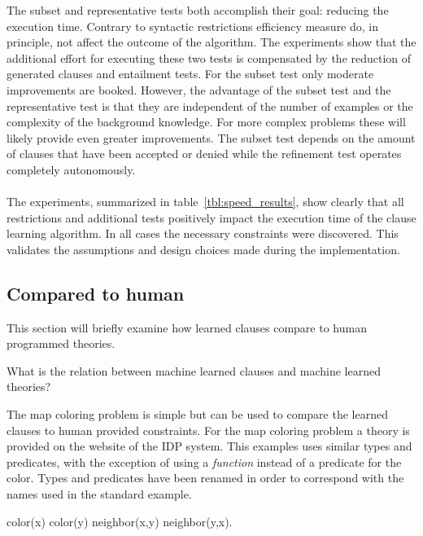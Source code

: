 The subset and representative tests both accomplish their goal: reducing the execution time.
Contrary to syntactic restrictions efficiency measure do, in principle, not affect the outcome of the algorithm.
The experiments show that the additional effort for executing these two tests is compensated by the reduction of generated clauses and entailment tests.
For the subset test only moderate improvements are booked.
However, the advantage of the subset test and the representative test is that they are independent of the number of examples or the complexity of the background knowledge.
For more complex problems these will likely provide even greater improvements.
The subset test depends on the amount of clauses that have been accepted or denied while the refinement test operates completely autonomously.
\\\\
The experiments, summarized in table~\ref{tbl:speed_results}, show clearly that all restrictions and additional tests positively impact the execution time of the clause learning algorithm.
In all cases the necessary constraints were discovered.
This validates the assumptions and design choices made during the implementation.


\subsection{Compared to human}

This section will briefly examine how learned clauses compare to human programmed theories.

\begin{question}
	What is the relation between machine learned clauses and machine learned theories?
\end{question}

\begin{observation}
\label{exp:cd_user_show}
	The map coloring problem is simple but can be used to compare the learned clauses to human provided constraints.
	For the map coloring problem a theory is provided on the website of the IDP system.
	This examples uses similar types and predicates, with the exception of using a \emph{function} instead of a predicate for the color.
	Types and predicates have been renamed in order to correspond with the names used in the standard example.  
	\begin{shiftedflalign*}
		color(x) \neq color(y) \leftarrow neighbor(x,y) \lor neighbor(y,x).
	\end{shiftedflalign*}

\end{observation}

